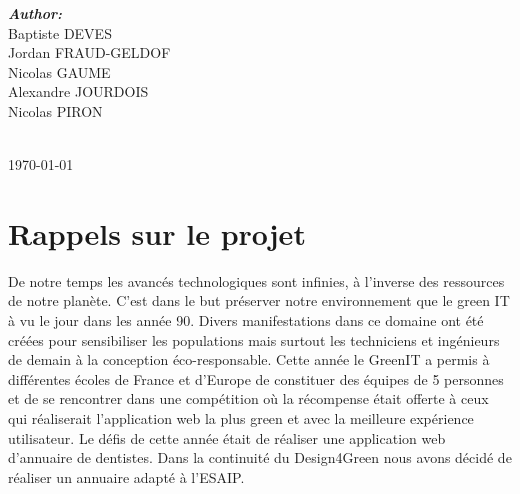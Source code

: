 \documentclass[11pt,a4paper]{report}
\begin{document}
\begin{titlepage}

\begin{minipage}{0.4\textwidth}
\begin{flushleft} \large
\emph{\textbf {Author:}}\\
Baptiste \textsc{DEVES}\\ %
Jordan \textsc{FRAUD-GELDOF}\\
Nicolas \textsc{GAUME}\\
Alexandre \textsc{JOURDOIS}\\
Nicolas \textsc{PIRON}\\
\end{flushleft}

\end{minipage}\\[2cm]



{\large \today}\\[2cm] %

\vfill %

\end{titlepage}
\renewcommand{\contentsname}{Sommaire} 
\tableofcontents

	\chapter{Rappels sur le projet}
		De notre temps les avancés technologiques sont infinies, à l'inverse des ressources de notre planète. C'est dans le but préserver notre environnement que le green IT à vu le jour dans les année 90. Divers manifestations dans ce domaine ont été créées pour sensibiliser les populations mais surtout les techniciens et ingénieurs de demain à la conception éco-responsable. Cette année le GreenIT a permis à différentes écoles de France et d'Europe de constituer des équipes de 5 personnes et de se rencontrer dans une compétition  où la récompense était offerte à ceux qui réaliserait l'application web la plus green et avec la meilleure expérience utilisateur. Le défis de cette année était de réaliser une application web d'annuaire de dentistes. Dans la continuité du Design4Green nous avons décidé de réaliser un annuaire adapté à l'ESAIP.
		
\end{document}
